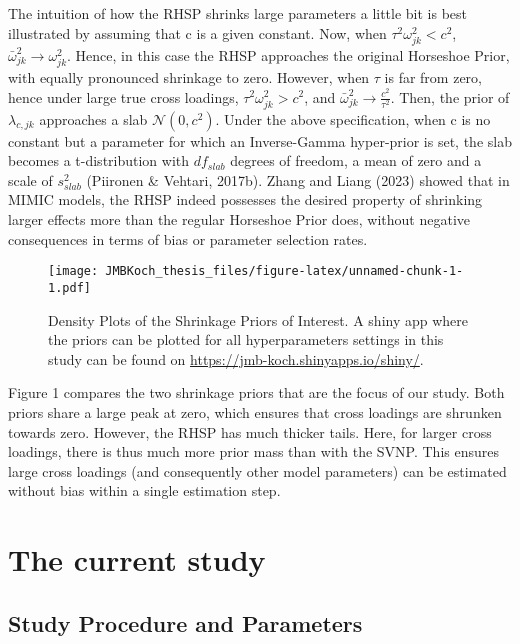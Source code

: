 \documentclass[
  man, donotrepeattitle,floatsintext]{apa6}
\begin{document}
The intuition of how the RHSP shrinks large parameters a little bit is
best illustrated by assuming that c is a given constant. Now, when
\(\tau^2 \omega^2_{jk} < c^2\), \(\bar{\omega}^2_{jk} \to \omega^2_{jk}\).
Hence, in this case the RHSP approaches the original Horseshoe Prior,
with equally pronounced shrinkage to zero. However, when \(\tau\) is far
from zero, hence under large true cross loadings,
\(\tau^2 \omega^2_{jk} > c^2\), and
\(\bar{\omega}^2_{jk} \to \frac{c^2}{\tau^2}\). Then, the prior of
\(\lambda_{c,jk}\) approaches a slab \(\mathcal{N}(0, c^2)\). Under the
above specification, when c is no constant but a parameter for which an
Inverse-Gamma hyper-prior is set, the slab becomes a t-distribution with
\(df_{slab}\) degrees of freedom, a mean of zero and a scale of
\(s_{slab}^2\) (Piironen \& Vehtari, 2017b). Zhang and Liang (2023) showed that
in MIMIC models, the RHSP indeed possesses the desired property of
shrinking larger effects more than the regular Horseshoe Prior does,
without negative consequences in terms of bias or parameter selection
rates.

\begin{figure}
\centering
\texttt{[image: JMBKoch\_thesis\_files/figure-latex/unnamed-chunk-1-1.pdf]}
\caption{\label{fig:unnamed-chunk-1}Density Plots of the Shrinkage Priors of Interest. A shiny app where the priors can be plotted for all hyperparameters settings in this study can be found on \url{https://jmb-koch.shinyapps.io/shiny/}.}
\end{figure}

Figure 1 compares the two shrinkage priors that are the focus of our
study. Both priors share a large peak at zero, which ensures that cross
loadings are shrunken towards zero. However, the RHSP has much thicker
tails. Here, for larger cross loadings, there is thus much more prior
mass than with the SVNP. This ensures large cross loadings (and
consequently other model parameters) can be estimated without bias
within a single estimation step.

\hypertarget{the-current-study}{%
\section{The current study}\label{the-current-study}}

\hypertarget{study-procedure-and-parameters}{%
\subsection{Study Procedure and Parameters}\label{study-procedure-and-parameters}}
\end{document}
